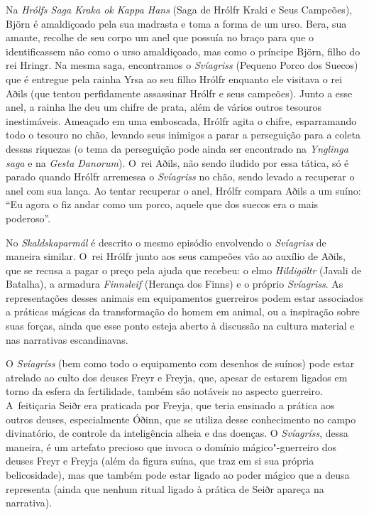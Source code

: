 
Na \emph{Hrólfs Saga Kraka ok Kappa Hans} (Saga de Hrólfr Kraki e Seus
Campeões), Björn é amaldiçoado pela sua madrasta e toma a forma de um
urso. Bera, sua amante, recolhe de seu corpo um anel que possuía no
braço para que o identificassem não como o urso amaldiçoado, mas como o
príncipe Björn, filho do rei Hringr. Na mesma saga, encontramos o
\emph{Svíagriss} (Pequeno Porco dos Suecos) que é entregue pela rainha
Yrsa ao seu filho Hrólfr enquanto ele visitava o rei Aðils (que tentou
perfidamente assassinar Hrólfr e seus campeões). Junto a esse anel, a
rainha lhe deu um chifre de prata, além de vários outros tesouros
inestimáveis. Ameaçado em uma emboscada, Hrólfr agita o chifre,
esparramando todo o tesouro no chão, levando seus inimigos a parar a
perseguição para a coleta dessas riquezas (o tema da perseguição pode
ainda ser encontrado na \emph{Ynglinga saga} e na \emph{Gesta Danorum}).
O~rei Aðils, não sendo iludido por essa tática, só é parado quando
Hrólfr arremessa o \emph{Svíagriss} no chão, sendo levado a recuperar o
anel com sua lança. Ao tentar recuperar o anel, Hrólfr compara Aðils a
um suíno: ``Eu agora o fiz andar como um porco, aquele que dos suecos
era o mais poderoso''.

No \emph{Skaldskaparmál} é descrito o mesmo episódio envolvendo o
\emph{Svíagriss} de maneira similar. O~rei Hrólfr junto aos seus
campeões vão ao auxílio de Aðils, que se recusa a pagar o preço pela
ajuda que recebeu: o elmo \emph{Hildigöltr} (Javali de Batalha), a
armadura \emph{Finnsleif} (Herança dos Finns) e o próprio
\emph{Svíagriss}. As representações desses animais em equipamentos
guerreiros podem estar associados a práticas mágicas da transformação do
homem em animal, ou a inspiração sobre suas forças, ainda que esse ponto
esteja aberto à discussão na cultura material e nas narrativas
escandinavas.

O \emph{Svíagríss} (bem como todo o equipamento com desenhos de suínos)
pode estar atrelado ao culto dos deuses Freyr e Freyja, que, apesar de
estarem ligados em torno da esfera da fertilidade, também são notáveis
no aspecto guerreiro. A~feitiçaria Seiðr era praticada por Freyja, que
teria ensinado a prática aos outros deuses, especialmente Óðinn, que se
utiliza desse conhecimento no campo divinatório, de controle da
inteligência alheia e das doenças. O \emph{Svíagríss}, dessa maneira, é
um artefato precioso que invoca o domínio mágico"-guerreiro dos deuses
Freyr e Freyja (além da figura suína, que traz em si sua própria
belicosidade), mas que também pode estar ligado ao poder mágico que a
deusa representa (ainda que nenhum ritual ligado à prática de Seiðr
apareça na narrativa).

